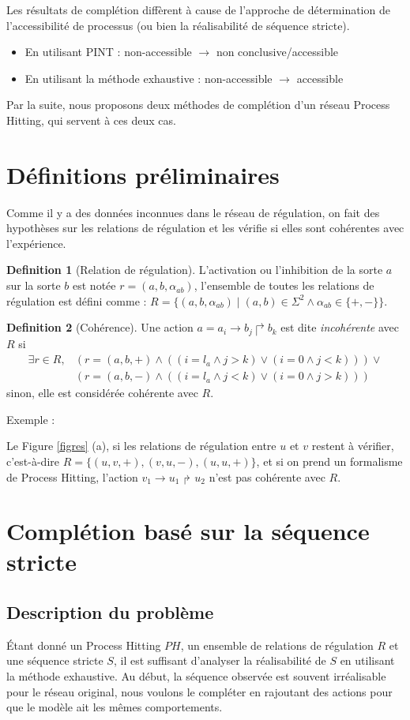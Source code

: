 \documentclass[11pt]{report}
\theoremstyle{definition}
\newtheorem{Def}{Definition}[chapter]
\newcommand{\ac}[3]{$#1\to#2\Rsh#3$}
\newcommand{\acm}[3]{#1\to#2\Rsh#3}
\begin{document}
Les r\'esultats de compl\'etion diff\`erent \`a cause de l'approche de d\'etermination de l'accessibilit\'e de processus (ou bien la r\'ealisabilit\'e de s\'equence stricte).

\begin{itemize}
\item En utilisant {\Large P}INT : non-accessible $\to$ non conclusive/accessible
\item En utilisant la m\'ethode exhaustive : non-accessible $\to$ accessible
\end{itemize} 
Par la suite, nous proposons deux m\'ethodes de compl\'etion d'un r\'eseau Process Hitting, qui servent \`a ces deux cas.
\section{D\'efinitions pr\'eliminaires}
Comme il y a des donn\'ees inconnues dans le r\'eseau de r\'egulation, on fait des hypoth\`eses sur les relations de r\'egulation et les v\'erifie si elles sont coh\'erentes avec l'exp\'erience.
\begin{Def}[Relation de r\'egulation] L'activation ou l'inhibition de la sorte $a$ sur la sorte $b$ est not\'ee $r=(a,b,\alpha_{ab})$, l'ensemble de toutes les relations de r\'egulation est d\'efini comme :
$R=\{(a,b,\alpha_{ab})\mid  (a,b)\in\Sigma^2\land \alpha_{ab}\in\{+,-\} \}$.
\end{Def}
\begin{Def}[Coh\'erence]
Une action $a=\acm{a_i}{b_j}{b_k}$ est dite \textit{incoh\'erente} avec $R$ si 
\begin{align*}
\exists r\in R,&(r=(a,b,+)\land ((i=l_a\land j>k)\lor(i=0\land j<k)))\lor\\
&(r=(a,b,-)\land ((i=l_a\land j<k)\lor(i=0\land j>k)))
\end{align*}
sinon, elle est consid\'er\'ee coh\'erente avec $R$.
\end{Def}
Exemple :

Le Figure \ref{figres} (a), si les relations de r\'egulation entre $u$ et $v$ restent \`a v\'erifier, c'est-\`a-dire $R=\{(u,v,+),(v,u,-),(u,u,+)\}$, et si on prend un formalisme de Process Hitting, l'action \ac{v_1}{u_1}{u_2} n'est pas coh\'erente avec $R$.
\section{Compl\'etion bas\'e sur la s\'equence stricte}\label{1}
\subsection*{Description du probl\`eme}
\'Etant donn\'e un Process Hitting $PH$, un ensemble de relations de r\'egulation $R$ et une s\'equence stricte $S$, il est suffisant d'analyser la r\'ealisabilit\'e de $S$ en utilisant la m\'ethode exhaustive. Au d\'ebut, la s\'equence observ\'ee est souvent irr\'ealisable pour le r\'eseau original, nous voulons le compl\'eter en rajoutant des actions pour que le mod\`ele ait les m\^emes comportements.
\end{document}
